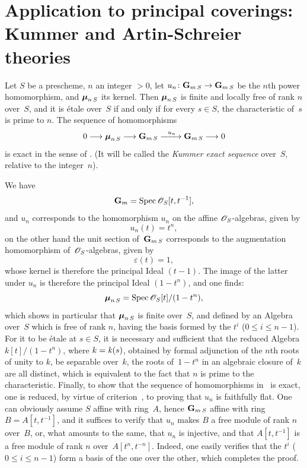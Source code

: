 \section[Application to principal coverings]{Application to principal coverings: Kummer and
Artin-Schreier theories}
\label{XI.6}

\begin{proposition}
\label{XI.6.1}
Let $S$ be a prescheme, $n$ an integer $>0$, let $u_n\colon
\GG_{m\,S}\to\GG_{m\,S}$ be the $n$th power homomorphism, and
$\boldsymbol{\mu}_{n\,S}$ its kernel. Then $\boldsymbol{\mu}_{n\,S}$ is finite and locally
free of rank $n$ over~$S$, and it is \'etale over~$S$ if and only if
for every $s\in S$, the characteristic of~$s$ is prime to
$n$. The sequence of homomorphisms
$$
0\to \bbmu_{n\,S}\to\GG_{m\,S}\lto{u_n}\GG_{m\,S}\to 0
$$
is exact in the sense of \No {}. (It will be called the \emph{Kummer
exact sequence} over~$S$, relative to the integer~$n$).
\end{proposition}

We
have
$$
\GG_m=\Spec\cal{O}_S[t,t^{-1}],
$$
and $u_n$ corresponds to the homomorphism $u_n$ on the affine
$\cal{O}_S$-algebras, given by
$$
u_n(t)=t^n,
$$
on the other hand the unit section of~$\mathbf{G}_{m\,S}$ corresponds to
the augmentation homomorphism of~$\cal{O}_S$-algebras, given
by
$$
\varepsilon(t)=1,
$$
whose kernel is therefore the principal Ideal $(t-1)$. The image of the
latter under $u_n$ is therefore the principal Ideal $(1-t^n)$, and one
finds:
$$
\bbmu_{n\,S}=\Spec\cal{O}_S[t]/(1-t^n),
$$
which shows in particular that $\boldsymbol{\mu}_{n\,S}$ is finite over~$S$,
and defined by an Algebra over~$S$ which is free of rank $n$,
having the basis formed by the $t^i$ ($0\leq i\leq n-1$). For it to be
\'etale at $s\in S$, it is necessary and sufficient that the reduced
Algebra $k[t]/(1-t^n)$, where $k=\mathit{k}(s)$, obtained by formal
adjunction of the $n$th roots of unity to $k$, be
separable over~$k$, \ie the roots of~$1-t^n$ in an algebraic
closure of~$k$ are all distinct, which is equivalent to the fact
that $n$ is prime to the characteristic. Finally, to show that the
sequence of homomorphisms in~ is exact, one is reduced,
by virtue of criterion~, to proving that
$u_n$
is faithfully flat. One can obviously assume $S$ affine
with ring~$A$, hence $\mathbf{G}_{m\,S}$ affine with ring $B=A[t,t^{-1}]$, and it
suffices to verify that $u_n$ makes $B$ a free module of rank
$n$ over~$B$, or, what amounts to the same, that $u_n$ is injective, and
that $A[t,t^{-1}]$ is a free module of rank $n$ over~$A[t^n,t^{-n}]$.
Indeed, one easily verifies that the
$t^i$ ($0\leq i\leq n-1$) form a basis of the one over the other, which
completes the proof.


